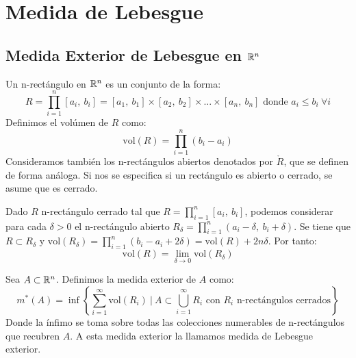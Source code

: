 
\section{Medida de Lebesgue}

\subsection{Medida Exterior de Lebesgue en $\mathbb{R}^n$}

\begin{definición}
Un n-rectángulo en $\mathbb{R}^n$ es un conjunto de la forma:
\begin{equation}
    R = \prod_{i=1}^n [a_i, \ b_i] = [a_1, \ b_1] \times [a_2, \ b_2] \times ... \times [a_n, \ b_n] \text{ donde } a_i \leq b_i \ \forall i
\end{equation}
Definimos el volúmen de $R$ como:
\begin{equation}
    \text{vol}(R) = \prod_{i=1}^n (b_i - a_i)
\end{equation}
Consideramos también los n-rectángulos abiertos denotados por $\mathring{R}$, que se definen de forma análoga. Si nos se especifica si un rectángulo es abierto o cerrado, se asume que es cerrado.
\end{definición}

\begin{observación}
Dado $R$ n-rectángulo cerrado tal que $R = \prod_{i=1}^n [a_i, \ b_i]$, podemos considerar para cada $\delta > 0$ el n-rectángulo abierto $R_\delta = \prod_{i=1}^n (a_i - \delta, \ b_i + \delta)$. Se tiene que $R \subset R_\delta$ y $\text{vol}(R_\delta) = \prod_{i=1}^n (b_i - a_i + 2\delta) = \text{vol}(R) + 2n\delta$. Por tanto:
\begin{equation}
    \text{vol}(R) = \lim_{\delta \to 0} \text{vol}(R_\delta)
\end{equation}
\end{observación}

\begin{definición}
Sea $A \subset \mathbb{R}^n$. Definimos la medida exterior de $A$ como:
\begin{equation}
    m^*(A) = \inf \left\{ \sum_{i=1}^\infty \text{vol}(R_i) \ | \ A \subset \bigcup_{i=1}^\infty R_i \text{ con } R_i \text{ n-rectángulos cerrados} \right\}
\end{equation}
Donde la ínfimo se toma sobre todas las colecciones numerables de n-rectángulos que recubren $A$. A esta medida exterior la llamamos medida de Lebesgue exterior.
\end{definición}

